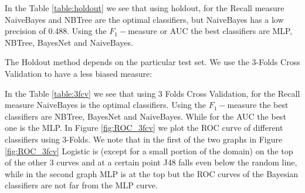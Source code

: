 \documentclass[fleqn,10pt]{SelfArx} %
\begin{document}
\noindent
In the Table \ref{table:holdout} we see that using holdout, for the Recall measure NaiveBayes and NBTree are the optimal classifiers, but NaiveBayes has a low precision of 0.488. Using the $F_1-$measure or AUC the best classifiers are MLP, NBTree, BayesNet and NaiveBayes.\newline

The Holdout method depends on the particular test set. We use the 3-Folds Cross Validation to have a less biased measure:

\begin{table}[h!]
	\caption{Evaluation using 3-Folds CV and all attributes}
	\label{table:3fcv}
\end{table}

\noindent
In the Table \ref{table:3fcv} we see that using 3 Folds Cross Validation, for the Recall measure NaiveBayes is the optimal classifiers. Using the $F_1-$measure the best classifiers are NBTree, BayesNet and NaiveBayes. While for the AUC the best one is the MLP.
In Figure \ref{fig:ROC_3fcv} we plot the ROC curve of different classifiers using 3-Folds. We note that in the first of the two graphs in Figure \ref{fig:ROC_3fcv} Logistic is (except for a small portion of the domain) on the top of the other 3 curves and at a certain point J48 falls even below the random line, while in the second graph MLP is at the top but the ROC curves of the Bayesian classifiers are not far from the MLP curve.
\end{document}
